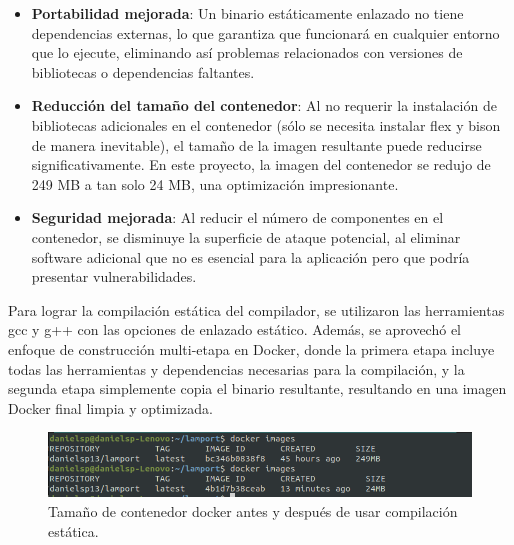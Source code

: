 \begin{itemize}
\item \textbf{Portabilidad mejorada}: Un binario estáticamente enlazado no tiene dependencias externas, lo que garantiza que funcionará en cualquier entorno que lo ejecute, eliminando así problemas relacionados con versiones de bibliotecas o dependencias faltantes.
\item \textbf{Reducción del tamaño del contenedor}: Al no requerir la instalación de bibliotecas adicionales en el contenedor (sólo se necesita instalar flex y bison de manera inevitable), el tamaño de la imagen resultante puede reducirse significativamente. En este proyecto, la imagen del contenedor se redujo de 249 MB a tan solo 24 MB, una optimización impresionante.
\item \textbf{Seguridad mejorada}: Al reducir el número de componentes en el contenedor, se disminuye la superficie de ataque potencial, al eliminar software adicional que no es esencial para la aplicación pero que podría presentar vulnerabilidades.
\end{itemize}

Para lograr la compilación estática del compilador, se utilizaron las herramientas gcc y g++ con las opciones de enlazado estático. Además, se aprovechó el enfoque de construcción multi-etapa en Docker, donde la primera etapa incluye todas las herramientas y dependencias necesarias para la compilación, y la segunda etapa simplemente copia el binario resultante, resultando en una imagen Docker final limpia y optimizada.

\begin{figure}[h]
    \begin{adjustbox}{center}
        \includegraphics[width=\linewidth]{images/implementacion/docker/docker_reduce.png}
    \end{adjustbox}
    \caption{Tamaño de contenedor docker antes y después de usar compilación estática.}
    \label{fig:DockerReduce}
\end{figure}